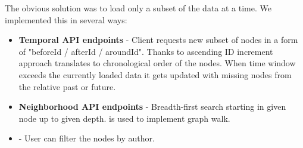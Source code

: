 The obvious solution was to load only a subset of the data at a time. We implemented this in several ways:
\begin{itemize}
    \item \textbf{Temporal API endpoints} - Client requests new subset of nodes in a form of "beforeId / afterId / aroundId".
    Thanks to ascending ID increment approach translates to chronological order of the nodes.
    When time window exceeds the currently loaded data it gets updated with missing nodes from the relative past or future.
    \item \textbf{Neighborhood API endpoints} - Breadth-first search starting in given node up to given depth. is used to implement graph walk.
    \item \textbf{} - User can filter the nodes by author.
\end{itemize}